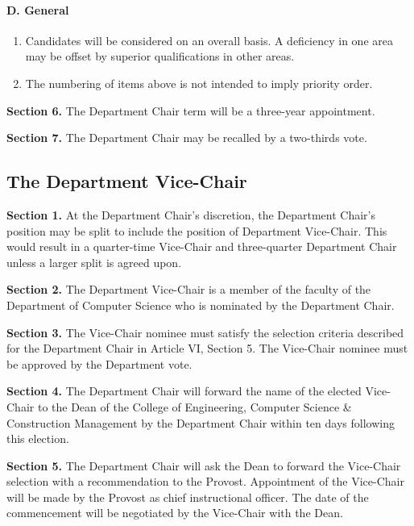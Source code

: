\documentclass{scrartcl}
\begin{document}
\paragraph{D. General}

\begin{enumerate}
\item Candidates will be considered on an overall basis. A deficiency in one area may be offset by superior qualifications in other areas.
\item The numbering of items above is not intended to imply priority order.
\end{enumerate}

\textbf{Section 6.} The Department Chair term will be a three-year appointment.

\textbf{Section 7.} The Department Chair may be recalled by a two-thirds vote.

\subsection*{The Department Vice-Chair}
{}


\textbf{Section 1.} At the Department Chair's discretion, the Department Chair's position may be split to include the position of Department Vice-Chair. This would result in a quarter-time Vice-Chair and three-quarter Department Chair unless a larger split is agreed upon.

\textbf{Section 2.} The Department Vice-Chair is a member of the faculty of the Department of Computer Science who is nominated by the Department Chair.

\textbf{Section 3.} The Vice-Chair nominee must satisfy the selection criteria described for the Department Chair in Article VI, Section 5. The Vice-Chair nominee must be approved by the Department vote.

\textbf{Section 4.} The Department Chair will forward the name of the elected Vice-Chair to the Dean of the College of Engineering, Computer Science \& Construction Management by the Department Chair within ten days following this election.

\textbf{Section 5.} The Department Chair will ask the Dean to forward the Vice-Chair selection with a recommendation to the Provost. Appointment of the Vice-Chair will be made by the Provost as chief instructional officer. The date of the commencement will be negotiated by the Vice-Chair with the Dean.
\end{document}
